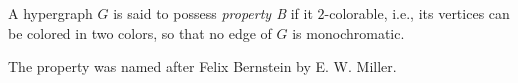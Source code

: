 \documentclass[12pt]{article}
\begin{document}
A hypergraph $G$ is said to possess \emph{property B} if it $2$-colorable, i.e., its vertices can be colored in two colors, so that no edge of $G$ is monochromatic.

The property was named after Felix Bernstein by E. W. Miller.
\end{document}
